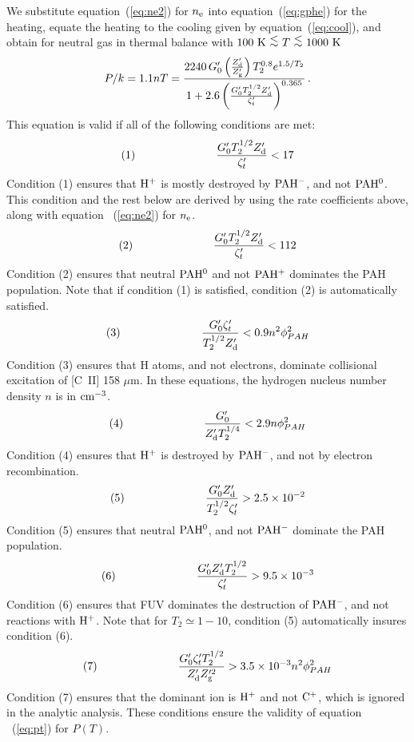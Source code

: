 \documentclass[12pt,preprint,flushrt]{aastex}
\newcommand{\beq}{\begin{equation}}
\newcommand{\eeq}{\end{equation}}
\newcommand{\al}{\mbox{ \raisebox{-.4ex}{$\stackrel{\textstyle <}{\sim}$} }}
\newcommand{\gs}{G_{0}^\prime}
\newcommand{\zd}{Z_{\rm d}^\prime}
\newcommand{\zg}{Z_{\rm g}^\prime}
\newcommand{\zio}{\zeta_{t}^\prime}
\begin{document}
We substitute equation~(\ref{eq:ne2}) for $n_{\rm e}$ into equation~(\ref{eq:gphe}) for
the heating, equate the heating to the cooling given by
equation~(\ref{eq:cool}),
and obtain for neutral gas in thermal balance with
$100\,\,{\rm K} \al T \al 1000\,\,{\rm K}$
\beq
   P/k = 1.1nT =
       \frac{2240\, \gs \left( \frac{\zd}{\zg} \right) T_2^{0.8}e^{1.5/T_2}}
      {1 + 2.6 \left( \frac{\gs T_2^{1/2} \zd}{\zio}\right)^{0.365}}\, .
\label{eq:pt}
\eeq
This equation is valid if all of the following conditions are met:
\beq
(1)\hspace{1.0in}\frac{\gs T_2^{1/2} \zd}{\zio} < 17
\eeq
Condition (1) ensures that ${\rm H^+}$ is mostly destroyed by ${\rm PAH^-}$,
and not ${\rm PAH^0}$. This condition and the rest below are derived by
using the rate coefficients above, along with equation ~(\ref{eq:ne2}) for
$n_{\rm e}$.
\beq
(2)\hspace{1.0in}\frac{\gs T_2^{1/2} \zd}{\zio} < 112
\eeq
Condition (2) ensures that neutral ${\rm PAH^0}$ and not ${\rm PAH^+}$
dominates the PAH population. Note that if condition (1) is satisfied,
condition (2) is automatically satisfied.
\beq
(3)\hspace{1.0in}\frac{\gs \zio}{T_2^{1/2}\zd} < 0.9 n^2 \phi _{PAH}^2
\eeq
Condition (3) ensures that H atoms, and not electrons, dominate
collisional excitation of [C~II] 158 $\mu$m. In these equations,
the hydrogen nucleus number density $n$ is in ${\rm cm^{-3}}$.
\beq
(4)\hspace{1.0in}\frac{\gs}{\zd T_2^{1/4}} < 2.9 n\phi _{PAH}^2
\eeq
Condition (4) ensures that ${\rm H^+}$ is destroyed by ${\rm PAH^-}$, and
not by electron recombination.
\beq
(5)\hspace{1.0in}\frac{\gs\zd}{T_2^{1/2}\zio} > 2.5\times 10^{-2}
\eeq
Condition (5) ensures that neutral ${\rm PAH^0}$, and not ${\rm PAH^-}$
dominate the PAH population.
\beq
(6)\hspace{1.0in}\frac{\gs\zd T_2^{1/2}}{\zio} > 9.5\times 10^{-3}
\eeq
Condition (6) ensures that FUV dominates the destruction of ${\rm PAH^-}$,
and not reactions with ${\rm H^+}$. Note that for $T_2\simeq 1-10$,
condition (5) automatically insures condition (6).
\beq
(7)\hspace{1.0in}\frac{\gs\zio T_2^{1/2}}{\zd Z_{\rm g}^{\prime 2}} > 3.5\times 10^{-3}n^2
\phi _{PAH}^2
\eeq
Condition (7) ensures that the dominant ion is ${\rm H^+}$ and not
${\rm C^+}$, which is ignored in the analytic analysis. These conditions
ensure the validity of equation ~(\ref{eq:pt}) for $P(T)$.
\end{document}
